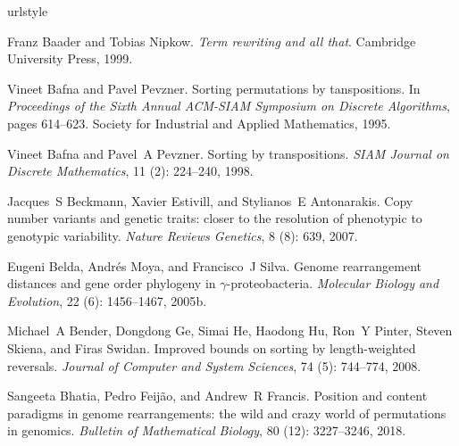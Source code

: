 \documentclass[12pt,a4paper]{amsart}
\numberwithin{equation}{section}
\begin{document}
\begin{thebibliography}{38}
\providecommand{\natexlab}[1]{#1}
\providecommand{\url}[1]{\texttt{#1}}
\expandafter\ifx\csname urlstyle\endcsname\relax
  \providecommand{\doi}[1]{doi: #1}\else
  \providecommand{\doi}{doi: \begingroup \urlstyle{rm}\Url}\fi

Franz Baader and Tobias Nipkow.
\newblock \emph{Term rewriting and all that}.
\newblock Cambridge University Press, 1999.

Vineet Bafna and Pavel Pevzner.
\newblock Sorting permutations by tanspositions.
\newblock In \emph{Proceedings of the Sixth Annual ACM-SIAM Symposium on
  Discrete Algorithms}, pages 614--623. Society for Industrial and Applied
  Mathematics, 1995.

Vineet Bafna and Pavel~A Pevzner.
\newblock Sorting by transpositions.
\newblock \emph{SIAM Journal on Discrete Mathematics}, 11
  (2): 224--240, 1998.

Jacques~S Beckmann, Xavier Estivill, and Stylianos~E Antonarakis.
\newblock Copy number variants and genetic traits: closer to the resolution of
  phenotypic to genotypic variability.
\newblock \emph{Nature Reviews Genetics}, 8 (8): 639, 2007.

\bibitem[Belda et~al.(2005{\natexlab{b}})]{belda2005genome}
Eugeni Belda, Andr{\'e}s Moya, and Francisco~J Silva.
\newblock Genome rearrangement distances and gene order phylogeny in
  $\gamma$-proteobacteria.
\newblock \emph{Molecular Biology and Evolution}, 22 (6):
  1456--1467, 2005{\natexlab{b}}.

Michael~A Bender, Dongdong Ge, Simai He, Haodong Hu, Ron~Y Pinter, Steven
  Skiena, and Firas Swidan.
\newblock Improved bounds on sorting by length-weighted reversals.
\newblock \emph{Journal of Computer and System Sciences}, 74
  (5): 744--774, 2008.

Sangeeta Bhatia, Pedro Feij{\~a}o, and Andrew~R Francis.
\newblock Position and content paradigms in genome rearrangements: the wild and
  crazy world of permutations in genomics.
\newblock \emph{Bulletin of Mathematical Biology}, 80 (12):
  3227--3246, 2018.


\end{thebibliography}
\end{document}
